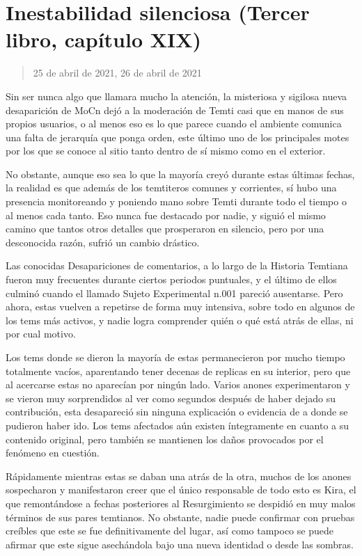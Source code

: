\documentclass[
  spanish,
]{book}
\begin{document}
\hypertarget{inestabilidad-silenciosa-tercer-libro-capuxedtulo-xix}{%
\section{Inestabilidad silenciosa (Tercer libro, capítulo XIX)}\label{inestabilidad-silenciosa-tercer-libro-capuxedtulo-xix}}

\begin{quote}
25 de abril de 2021, 26 de abril de 2021
\end{quote}

Sin ser nunca algo que llamara mucho la atención, la misteriosa y sigilosa nueva desaparición de MoCn dejó a la moderación de Temti casi que en manos de sus propios usuarios, o al menos eso es lo que parece cuando el ambiente comunica una falta de jerarquía que ponga orden, este último uno de los principales motes por los que se conoce al sitio tanto dentro de sí mismo como en el exterior.

No obstante, aunque eso sea lo que la mayoría creyó durante estas últimas fechas, la realidad es que además de los temtiteros comunes y corrientes, sí hubo una presencia monitoreando y poniendo mano sobre Temti durante todo el tiempo o al menos cada tanto. Eso nunca fue destacado por nadie, y siguió el mismo camino que tantos otros detalles que prosperaron en silencio, pero por una desconocida razón, sufrió un cambio drástico.

Las conocidas Desapariciones de comentarios, a lo largo de la Historia Temtiana fueron muy frecuentes durante ciertos periodos puntuales, y el último de ellos culminó cuando el llamado Sujeto Experimental n.001 pareció ausentarse. Pero ahora, estas vuelven a repetirse de forma muy intensiva, sobre todo en algunos de los tems más activos, y nadie logra comprender quién o qué está atrás de ellas, ni por cual motivo.

Los tems donde se dieron la mayoría de estas permanecieron por mucho tiempo totalmente vacíos, aparentando tener decenas de replicas en su interior, pero que al acercarse estas no aparecían por ningún lado. Varios anones experimentaron y se vieron muy sorprendidos al ver como segundos después de haber dejado su contribución, esta desapareció sin ninguna explicación o evidencia de a donde se pudieron haber ido. Los tems afectados aún existen íntegramente en cuanto a su contenido original, pero también se mantienen los daños provocados por el fenómeno en cuestión.

Rápidamente mientras estas se daban una atrás de la otra, muchos de los anones sospecharon y manifestaron creer que el único responsable de todo esto es Kira, el que remontándose a fechas posteriores al Resurgimiento se despidió en muy malos términos de sus pares temtianos. No obstante, nadie puede confirmar con pruebas creíbles que este se fue definitivamente del lugar, así como tampoco se puede afirmar que este sigue asechándola bajo una nueva identidad o desde las sombras.
\end{document}
